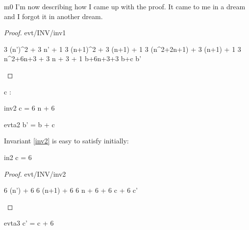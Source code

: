 \documentclass[12pt]{amsart}
\begin{document}
\begin{machine}{m0}
I'm now describing how I came up with the proof. It came to me in a dream and I forgot it in another dream.
%
\begin{proof}{evt/INV/inv1}
	\begin{calculation}
		3 \cdot (n')^2 + 3 \cdot n' + 1
	\hint{=}{ \ref{a0} }
		3 \cdot (n+1)^2 + 3 \cdot (n+1) + 1
		3 \cdot (n^2+2\cdot n+1) + 3 \cdot (n+1) + 1
		3 \cdot n^2+6\cdot n+3 + 3 \cdot n + 3 + 1
	\hint{=}{ \ref{inv1} }
		b+6\cdot n+3+3
		b+c
		b'
	\end{calculation}
\end{proof}

\begin{variable}
	c : \Int
\end{variable}

\begin{invariant}{inv2}
	c = 6 \cdot n + 6
\end{invariant} 

\begin{evassignment}{evt}{a2}
	b' = b + c
\end{evassignment}

Invariant \ref{inv2} is easy to satisfy initially:

\begin{initialization}{in2}
	c = 6
\end{initialization}

\begin{proof}{evt/INV/inv2}
	\begin{calculation}
		6 \cdot (n') + 6
	\hint{=}{ \ref{a0} }
		6 \cdot (n+1) + 6
	\hint{=}{ arithmetic }
		6 \cdot n + 6 + 6
	\hint{=}{ \ref{inv2} }
		c + 6
	\hint{=}{ \ref{a3} }
		c'
	\end{calculation}
\end{proof}
%
\begin{evassignment}{evt}{a3}
	c' = c + 6
\end{evassignment}

\end{machine}
\end{document}
